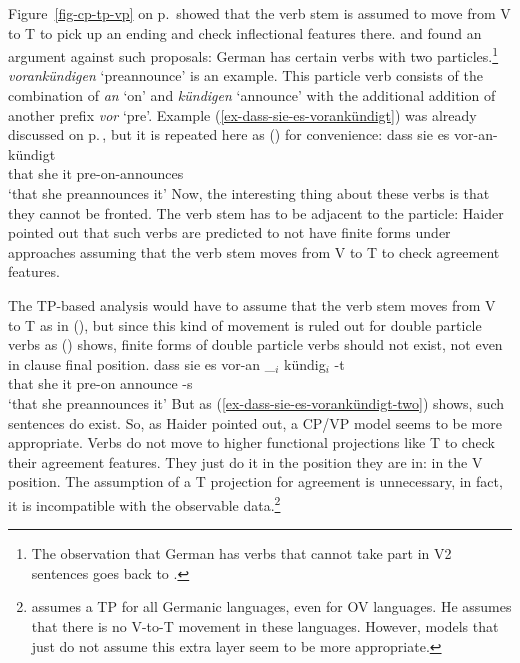 Figure~\ref{fig-cp-tp-vp} on p.\,\pageref{fig-cp-tp-vp} showed that the verb stem is assumed to move from V to T to
pick up an ending and check inflectional features there. \textcites[]{Haider93a}[--60]{Haider2010a} and \citet[Section~3.3]{Vikner2001a} found an
argument against such proposals: German has certain verbs with two particles.\footnote{%
  The observation that German has verbs that cannot take part in V2 sentences goes back to
  \citet{Hoehle91b}.
} 
\emph{vorankündigen} `preannounce'
is an example. This particle verb consists of the combination of \emph{an} `on' and \emph{kündigen} `announce' with
the additional addition of another prefix \emph{vor} `pre'. Example
(\ref{ex-dass-sie-es-vorankündigt}) was already discussed on
p.\,\pageref{ex-dass-sie-es-vorankündigt}, but it is repeated here as () for convenience:
\ea 
\label{ex-dass-sie-es-vorankündigt-two}
\gll dass sie es vor-an-kündigt\\
     that she it pre-on-announces\\
\glt `that she preannounces it'
\z
Now, the interesting thing about these verbs is that they cannot be fronted. The verb stem has to be
adjacent to the particle:
\eal
{}
\zl
Haider pointed out that such verbs are predicted to not have finite forms under approaches assuming
that the verb stem moves from V to T to check agreement features.

The TP-based analysis would have to assume that the verb stem  moves from V to T as in (), but
since this kind of movement is ruled out for double particle verbs as () shows, finite forms
of double particle verbs should not exist, not even in clause final position.
\ea 
\gll dass sie es vor-an \_$_i$ kündig$_i$ -t\\
     that she it pre-on {}    announce -s\\
\glt `that she preannounces it'
\z
But as (\ref{ex-dass-sie-es-vorankündigt-two}) shows, such sentences do exist. So, as Haider pointed
out, a CP/VP model seems to be more appropriate. Verbs do not move to higher functional projections
like T to check their agreement features. They just do it in the position they are in: in the V position. The
assumption of a T projection for agreement is unnecessary, in fact, it is incompatible with the
observable data.\footnote{%
  \citet{Vikner2001a} assumes a TP for all Germanic languages, even for OV languages. He assumes
  that there is no V-to-T movement in these languages. However, models that just do not assume this
  extra layer seem to be more appropriate.
}

